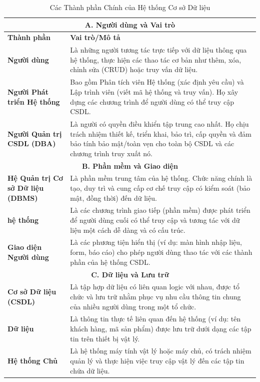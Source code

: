 \begin{table}[H]
\centering
\renewcommand{\arraystretch}{1.3}
\setlength{\tabcolsep}{6pt}
\begin{tabularx}{\textwidth}{|p{4cm}|X|}
\hline
\multicolumn{2}{|c|}{\textbf{A. Người dùng và Vai trò}} \\
\hline
\textbf{Thành phần} & \textbf{Vai trò/Mô tả} \\
\hline
\textbf{Người dùng} & Là những người tương tác trực tiếp với dữ liệu thông qua hệ thống, thực hiện các thao tác cơ bản như thêm, xóa, chỉnh sửa (CRUD) hoặc truy vấn dữ liệu. \\
\hline
\textbf{Người Phát triển Hệ thống} & Bao gồm Phân tích viên Hệ thống (xác định yêu cầu) và Lập trình viên (viết mã hệ thống và truy vấn). Họ xây dựng các chương trình để người dùng có thể truy cập CSDL. \\
\hline
\textbf{Người Quản trị CSDL (DBA)} & Là người có quyền điều khiển tập trung cao nhất. Họ chịu trách nhiệm thiết kế, triển khai, bảo trì, cấp quyền và đảm bảo tính bảo mật/toàn vẹn cho toàn bộ CSDL và các chương trình truy xuất nó. \\
\hline
\multicolumn{2}{|c|}{\textbf{B. Phần mềm và Giao diện}} \\
\hline
\textbf{Hệ Quản trị Cơ sở Dữ liệu (DBMS)} & Là phần mềm trung tâm của hệ thống. Chức năng chính là tạo, duy trì và cung cấp cơ chế truy cập có kiểm soát (bảo mật, đồng thời) đến dữ liệu. \\
\hline
\textbf{hệ thống} & Là các chương trình giao tiếp (phần mềm) được phát triển để người dùng cuối có thể truy cập và tương tác với dữ liệu một cách dễ dàng và có cấu trúc. \\
\hline
\textbf{Giao diện Người dùng} & Là các phương tiện hiển thị (ví dụ: màn hình nhập liệu, form, báo cáo) cho phép người dùng thao tác với các thành phần của hệ thống CSDL. \\
\hline
\multicolumn{2}{|c|}{\textbf{C. Dữ liệu và Lưu trữ}} \\
\hline
\textbf{Cơ sở Dữ liệu (CSDL)} & Là tập hợp dữ liệu có liên quan logic với nhau, được tổ chức và lưu trữ nhằm phục vụ nhu cầu thông tin chung của nhiều người dùng trong một tổ chức. \\
\hline
\textbf{Dữ liệu} & Là thông tin thực tế liên quan đến hệ thống (ví dụ: tên khách hàng, mã sản phẩm) được lưu trữ dưới dạng các tập tin trên thiết bị vật lý. \\
\hline
\textbf{Hệ thống Chủ} & Là hệ thống máy tính vật lý hoặc máy chủ, có trách nhiệm quản lý và thực hiện việc truy cập vật lý đến các tập tin chứa dữ liệu. \\
\hline
\end{tabularx}
\vspace{15pt} %
\caption{Các Thành phần Chính của Hệ thống Cơ sở Dữ liệu}
\label{tab:dbs_components}
\end{table}
